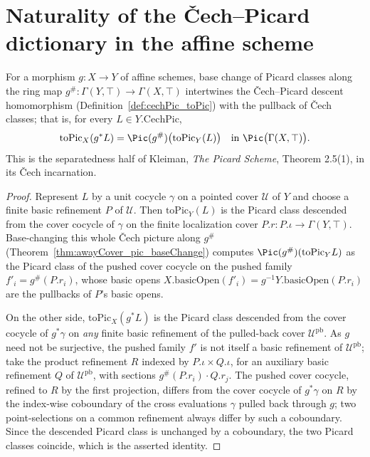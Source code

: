 \section{Naturality of the \v Cech--Picard dictionary in the affine scheme}
\label{sec:cechPic_naturality}

\begin{theorem}
  \label{thm:cechPic_toPic_map}
  \leanok
  For a morphism \(g \colon X \to Y\) of affine schemes, base change of Picard classes along the
  ring map \(g^{\#} \colon \Gamma(Y, \top) \to \Gamma(X, \top)\) intertwines the \v
  Cech--Picard descent homomorphism (Definition~\ref{def:cechPic_toPic}) with the pullback of
  \v Cech classes; that is, for every \(L \in Y.\mathrm{CechPic}\),
  \[
    \mathrm{toPic}_X(g^{*} L) = \Pic(g^{\#})\bigl(\mathrm{toPic}_Y(L)\bigr) \quad\text{in }
    \Pic\bigl(\Gamma(X, \top)\bigr).
  \]
  This is the separatedness half of Kleiman, \emph{The Picard Scheme}, Theorem 2.5(1), in its
  \v Cech incarnation.
\end{theorem}
\begin{proof}
  \leanok
  Represent \(L\) by a unit cocycle \(\gamma\) on a pointed cover \(\mathcal U\) of \(Y\) and
  choose a finite basic refinement \(P\) of \(\mathcal U\).  Then \(\mathrm{toPic}_Y(L)\) is the
  Picard class descended from the cover cocycle of \(\gamma\) on the finite localization cover
  \(P.r \colon P.\iota \to \Gamma(Y, \top)\).  Base-changing this whole \v Cech picture along
  \(g^{\#}\) (Theorem~\ref{thm:awayCover_pic_baseChange}) computes \(\Pic(g^{\#})(\mathrm{toPic}_Y
  L)\) as the Picard class of the pushed cover cocycle on the pushed family \(f'_i = g^{\#}(P.r_i)\),
  whose basic opens \(X.\mathrm{basicOpen}(f'_i) = g^{-1} Y.\mathrm{basicOpen}(P.r_i)\) are the
  pullbacks of \(P\)'s basic opens.

  On the other side, \(\mathrm{toPic}_X(g^{*} L)\) is the Picard class descended from the cover
  cocycle of \(g^{*}\gamma\) on \emph{any} finite basic refinement of the pulled-back cover
  \(\mathcal U^{\mathrm{pb}}\).  As \(g\) need not be surjective, the pushed family \(f'\) is not
  itself a basic refinement of \(\mathcal U^{\mathrm{pb}}\); take the product refinement \(R\)
  indexed by \(P.\iota \times Q.\iota\), for an auxiliary basic refinement \(Q\) of \(\mathcal
  U^{\mathrm{pb}}\), with sections \(g^{\#}(P.r_i) \cdot Q.r_j\).  The pushed cover cocycle,
  refined to \(R\) by the first projection, differs from the cover cocycle of \(g^{*}\gamma\) on
  \(R\) by the index-wise coboundary of the cross evaluations \(\gamma\) pulled back through
  \(g\); two point-selections on a common refinement always differ by such a coboundary.  Since
  the descended Picard class is unchanged by a coboundary, the two Picard classes coincide, which
  is the asserted identity.
\end{proof}

